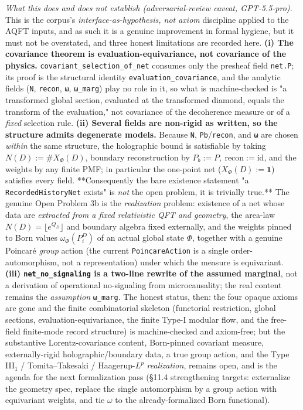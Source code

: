\documentclass[11pt,a4paper]{article}
\begin{document}
\emph{What this does and does not establish (adversarial-review caveat, GPT-5.5-pro).} This is the corpus's \emph{interface-as-hypothesis, not axiom} discipline applied to the AQFT inputs, and as such it is a genuine improvement in formal hygiene, but it must not be overstated, and three honest limitations are recorded here. \textbf{(i) The covariance theorem is evaluation-equivariance, not covariance of the physics.} \texttt{covariant\_selection\_of\_net} consumes only the presheaf field \texttt{net.P}; its proof is the structural identity \texttt{evaluation\_covariance}, and the analytic fields (\texttt{N}, \texttt{recon}, \texttt{ω}, \texttt{ω\_marg}) play no role in it, so what is machine-checked is "a transformed global section, evaluated at the transformed diamond, equals the transform of the evaluation," not covariance of the decoherence measure or of a \emph{fixed} selection rule. \textbf{(ii) Several fields are non-rigid as written, so the structure admits degenerate models.} Because \texttt{N}, \texttt{Pb}/\texttt{recon}, and \texttt{ω} are chosen \emph{within} the same structure, the holographic bound is satisfiable by taking $N(D) := \#X_\Phi(D)$, boundary reconstruction by $P_b := P,\ \mathrm{recon} := \mathrm{id}$, and the weights by any finite PMF; in particular the one-point net ($X_\Phi(D) := \mathbf 1$) satisfies every field. **Consequently the bare existence statement "a \texttt{RecordedHistoryNet} exists" is \emph{not} the open problem, it is trivially true.** The genuine Open Problem 3b is the \emph{realization} problem: existence of a net whose data are \emph{extracted from a fixed relativistic QFT and geometry}, the area-law $N(D)=\lfloor e^{Q_D}\rfloor$ and boundary algebra fixed externally, and the weights pinned to Born values $\omega_\Phi(P_i^D)$ of an actual global state $\Phi$, together with a genuine Poincaré \emph{group} action (the current \texttt{PoincareAction} is a single order-automorphism, not a representation) under which the measure is equivariant. \textbf{(iii) \texttt{net\_no\_signaling} is a two-line rewrite of the assumed marginal}, not a derivation of operational no-signaling from microcausality; the real content remains the \emph{assumption} \texttt{ω\_marg}. The honest status, then: the four opaque axioms are gone and the finite combinatorial skeleton (functorial restriction, global sections, evaluation-equivariance, the finite Type-I modular flow, and the free-field finite-mode record structure) is machine-checked and axiom-free; but the substantive Lorentz-covariance content, Born-pinned covariant measure, externally-rigid holographic/boundary data, a true group action, and the Type III$_1$ / Tomita–Takesaki / Haagerup-$L^p$ \emph{realization}, remains open, and is the agenda for the next formalization pass (§11.4 strengthening targets: externalize the geometry spec, replace the single automorphism by a group action with equivariant weights, and tie $\omega$ to the already-formalized Born functional).
\end{document}
